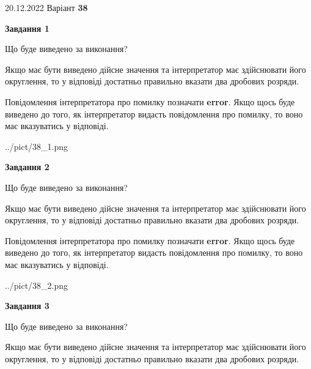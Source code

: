\documentclass[12pt, ukrainian]{article}
\begin{document}
{20.12.2022 Варіант \No \textbf { 38 }\par}
{
\begin {Large}

{\begin {center}\textbf{Завдання 1}\end {center}}\par
Що буде виведено за виконання? \par

Якщо має бути виведено дійсне значення та інтерпретатор має здійснювати його округлення, 
то у відповіді достатньо правильно вказати два дробових розряди.

Повідомлення інтерпретатора про помилку позначати \textbf{error}.
Якщо щось буде виведено до того, як інтерпретатор видасть повідомлення про помилку, 
то воно має вказуватись у відповіді. \par

\begin{center}
	{../pict/38_1.png}
\end{center}
\newpage

{\begin {center}\textbf{Завдання 2}\end {center}}\par
Що буде виведено за виконання? \par

Якщо має бути виведено дійсне значення та інтерпретатор має здійснювати його округлення, 
то у відповіді достатньо правильно вказати два дробових розряди.

Повідомлення інтерпретатора про помилку позначати \textbf{error}.
Якщо щось буде виведено до того, як інтерпретатор видасть повідомлення про помилку, 
то воно має вказуватись у відповіді. \par

\begin{center}
	{../pict/38_2.png}
\end{center}
\newpage

{\begin {center}\textbf{Завдання 3}\end {center}}\par
Що буде виведено за виконання? \par

Якщо має бути виведено дійсне значення та інтерпретатор має здійснювати його округлення, 
то у відповіді достатньо правильно вказати два дробових розряди.


\end{Large}}
\end{document}
